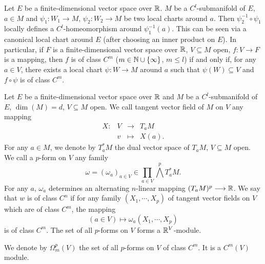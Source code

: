 \begin{remark}
    Let $E$ be a finite-dimensional vector space over $\mathbb{R}$.
    $M$ be a $C^l$-submanifold of $E$, $a \in M$ and $\psi_1 : W_1 \longrightarrow M$, $\psi_2 : W_2 \longrightarrow M$ be two local charts around $a$.
    Then $\psi^{-1}_2 \circ \psi_1$ locally defines a $C^l$-homeomorphism around $\psi^{-1}_1(a)$.
    This can be seen via a canonical local chart around $E$ (after choosing an inner product on $E$).
    In particular, if $F$ is a finite-dimensional vector space over $\mathbb{R}$, $V \subseteq M$ open, $f : V \longrightarrow F$ is a mapping, then $f$ is of class $C^m$ ($m \in \mathbb{N} \cup \{\infty\}$, $m \le l$) if and only if,
    for any $a \in V$, there exists a local chart $\psi : W \longrightarrow M$ around $a$ such that $\psi(W) \subseteq V$ and $f \circ \psi$ is of class $C^m$.
\end{remark}

\begin{definitionenv}
    Let $E$ be a finite-dimensional vector space over $\mathbb{R}$ and $M$ be a $C^l$-submanifold of $E$, $\dim(M) = d$, $V \subseteq M$ open.
    We call tangent vector field of $M$ on $V$ any mapping
    $$\begin{array}{rrcl}
        X : & V & \longrightarrow & T_aM\\
        & v & \longmapsto & X(a).
    \end{array}$$
    For any $a \in M$, we denote by $T^*_aM$ the dual vector space of $T_aM$, $V \subseteq M$ open.
    We call a $p$-form on $V$ any family
    $$\omega = (\omega_a)_{a \in V} \in \prod_{a \in V} \bigwedge^p T^*_aM.$$
    For any $a$, $\omega_a$ determines an alternating $n$-linear mapping $(T_aM)^p \longrightarrow \mathbb{R}$.
    We say that $w$ is of class $C^n$ if for any family $(X_1,\cdots,X_p)$ of tangent vector fields on $V$ which are of class $C^m$, the mapping
    $$(a \in V) \longmapsto \omega_a(X_1,\cdots,X_p)$$
    is of class $C^m$.
    The set of all $p$-forms on $V$ forms a $\mathbb{R}^V$-module.

    \quad We denote by $\Omega^p_m(V)$ the set of all $p$-forms on $V$ of class $C^m$.
    It is a $C^m(V)$ module.
\end{definitionenv}

